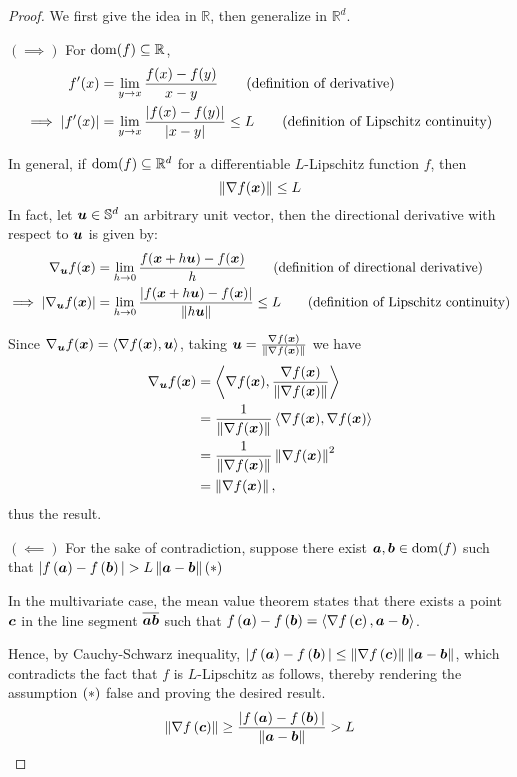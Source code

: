 \documentclass{article}
\newcommand{\R}{\mathbb{R}}
\begin{document}
\begin{proof}
We first give the idea in $\R$, then generalize in $\R^d$.

$(\implies)$
For $\dom(f)\subseteq\R$,
\begin{align*}
	f'(x) &= \lim_{y\to x} \frac{f(x)-f(y)}{x-y} \tag{definition of derivative}\\
	\implies \left| f'(x) \right| &= \lim_{y\to x} \frac{\left| f(x)-f(y) \right|}{\left| x-y \right|} \leq L \tag{definition of Lipschitz continuity}
\end{align*}

In general, if $\dom(f)\subseteq \R^d$ for a differentiable $L$-Lipschitz function $f$, then
\[
    \left\|\nabla f({\bm{x}})\right\| \leq L
\]
In fact, let ${\bm{u}} \in \mathbb{S}^d$ an arbitrary unit vector, then the directional derivative with respect to ${\bm{u}}$ is given by:
\begin{align*}
	\nabla_{\bm{u}} f({\bm{x}}) &= \lim_{h\to 0} \frac{f({\bm{x}}+h{\bm{u}})-f({\bm{x}})}{h} \tag{definition of directional derivative}\\
	\implies \left| \nabla_{\bm{u}} f({\bm{x}}) \right| &= \lim_{h\to 0} \frac{\left| f({\bm{x}}+h{\bm{u}})-f({\bm{x}}) \right|}{\left\|h{\bm{u}}\right\|} \leq L \tag{definition of Lipschitz continuity}
\end{align*}

Since $\nabla_{\bm{u}} f({\bm{x}})=\left\langle\nabla f({\bm{x}}),{\bm{u}}\right\rangle$, taking ${\bm{u}} = \frac{\nabla f({\bm{x}})}{\left\|\nabla f({\bm{x}})\right\|}$ we have
\begin{align*}
    \nabla_{\bm{u}} f({\bm{x}}) &= \left\langle\nabla f({\bm{x}}), \frac{\nabla f({\bm{x}})}{\left\|\nabla f({\bm{x}})\right\|}\right\rangle \\
    &= \frac{1}{\left\|\nabla f({\bm{x}})\right\|} \left\langle\nabla f({\bm{x}}), \nabla f({\bm{x}})\right\rangle \\
    &= \frac{1}{\left\|\nabla f({\bm{x}})\right\|} \left\|\nabla f({\bm{x}})\right\|^2 \\
    &= \left\|\nabla f({\bm{x}})\right\|,
\end{align*}
thus the result.

$(\impliedby)$ For the sake of contradiction, suppose there exist ${\bm{a}},{\bm{b}}\in \operatorname{dom}(f)$ such that $|f\parens{\va}-f\parens{\vb}|>L\norm{\va-\vb}$\hfill$\left(\ast\right)$

In the multivariate case, the mean value theorem states that there exists a point ${\bm{c}}$ in the line segment $\overline{{\bm{a}}{\bm{b}}}$ such that $f\left({\bm{a}}\right)-f\left({\bm{b}}\right)= \langle\nabla f\left({\bm{c}}\right), {\bm{a}}-{\bm{b}} \rangle$.

Hence, by Cauchy-Schwarz inequality, $|f\left({\bm{a}}\right)-f\left({\bm{b}}\right)|\leq \left\|\nabla f\left({\bm{c}}\right)\right\| \left\|{\bm{a}} - {\bm{b}}\right\|$, which contradicts the fact that $f$ is $L$-Lipschitz as follows, thereby rendering the assumption $\left(\ast\right)$ false and proving the desired result.
\[
    \left\|\nabla f\left({\bm{c}}\right)\right\| \geq \frac{|f\left({\bm{a}}\right)-f\left({\bm{b}}\right)|}{\left\|{\bm{a}}-{\bm{b}}\right\|}> L
\]
\end{proof}{}
\end{document}
